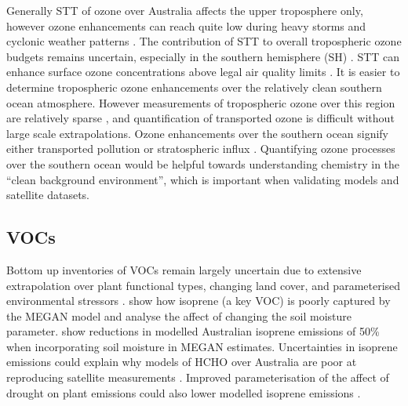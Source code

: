     Generally STT of ozone over Australia affects the upper troposphere only, however ozone enhancements can reach quite low during heavy storms and cyclonic weather patterns \parencite{Alexander2013}.
    The contribution of STT to overall tropospheric ozone budgets remains uncertain, especially in the southern hemisphere (SH) \parencite{Skerlak2014}.
    STT can enhance surface ozone concentrations above legal air quality limits \parencite[e.g.][]{Lelieveld2009,Lin2015}.
    It is easier to determine tropospheric ozone enhancements over the relatively clean southern ocean atmosphere.
    However measurements of tropospheric ozone over this region are relatively sparse \parencite{Skerlak2014}, and quantification of transported ozone is difficult without large scale extrapolations.
    Ozone enhancements over the southern ocean signify either transported pollution or stratospheric influx \parencite{Jacobson2000}.
    Quantifying ozone processes over the southern ocean would be helpful towards understanding chemistry in the ``clean background environment'', which is important when validating models and satellite datasets.
  
  \subsection{VOCs}
    
    Bottom up inventories of VOCs remain largely uncertain due to extensive extrapolation over plant functional types, changing land cover, and parameterised environmental stressors \parencite{Guenther2000,Kanakidou2005,Millet2006}.
    \textcite{Muller2008} show how isoprene (a key VOC) is poorly captured by the MEGAN model and analyse the affect of changing the soil moisture parameter.
    \textcite{Sindelarova2014} show reductions in modelled Australian isoprene emissions of 50\% when incorporating soil moisture in MEGAN estimates. 
    Uncertainties in isoprene emissions could explain why models of HCHO over Australia are poor at reproducing satellite measurements \parencite{Stavrakou2009}.
    Improved parameterisation of the affect of drought on plant emissions could also lower modelled isoprene emissions \parencite{Jiang2018}.
    
